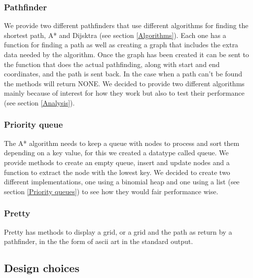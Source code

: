 \documentclass[12pt, a4paper]{article}
\begin{document}
\subsubsection{Pathfinder}
We provide two different pathfinders that use different algorithms for finding the shortest path, A* and Dijsktra (see section \ref{Algorithms}). Each one has a function for finding a path as well as creating a graph that includes the extra data needed by the algorithm. Once the graph has been created it can be sent to the function that does the actual pathfinding, along with start and end coordinates, and the path is sent back. In the case when a path can't be found the methods will return NONE. We decided to provide two different algorithms mainly because of interest for how they work but also to test their performance (see section \ref{Analysis}).

\subsubsection{Priority queue}
The A* algorithm needs to keep a queue with nodes to process and sort them depending on a key value, for this we created a datatype called queue. We provide methods to create an empty queue, insert and update nodes and a function to extract the node with the lowest key. We decided to create two different implementations, one using a binomial heap and one using a list (see section \ref{Priority queues}) to see how they would fair performance wise.

\subsubsection{Pretty}
Pretty has methods to display a grid, or a grid and the path as return by a pathfinder, in the the form of ascii art in the standard output.






\subsection{Design choices}
\end{document}
